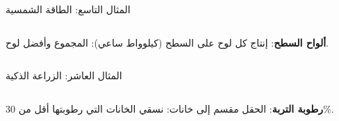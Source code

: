\begin{frame}[t]{المثال التاسع: الطاقة الشمسية}
    \begin{columns}[T]
        {\small\textbf{ألواح السطح}: إنتاج كل لوح على السطح (كيلوواط ساعي): المجموع وأفضل لوح.\par}
        \vspace{0.3cm}
    \end{columns}
\end{frame}

\begin{frame}[t]{المثال العاشر: الزراعة الذكية}
    \begin{columns}[T]
        {\small\textbf{رطوبة التربة}: الحقل مقسم إلى خانات: نسقي الخانات التي رطوبتها أقل من 30\%.\par}
        \vspace{0.3cm}
    \end{columns}
\end{frame}
